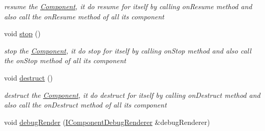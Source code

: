 \begin{DoxyCompactItemize}
\begin{DoxyCompactList}\small\item\em resume the \hyperlink{class_i_dream_sky_1_1_component}{Component}, it do resume for itself by calling on\+Resume method and also call the on\+Resume method of all its component \end{DoxyCompactList}\item 
void \hyperlink{class_i_dream_sky_1_1_component_1_1_owner_a15f03464f950e9dd594e9f044827e38f}{stop} ()\hypertarget{class_i_dream_sky_1_1_component_1_1_owner_a15f03464f950e9dd594e9f044827e38f}{}\label{class_i_dream_sky_1_1_component_1_1_owner_a15f03464f950e9dd594e9f044827e38f}

\begin{DoxyCompactList}\small\item\em stop the \hyperlink{class_i_dream_sky_1_1_component}{Component}, it do stop for itself by calling on\+Stop method and also call the on\+Stop method of all its component \end{DoxyCompactList}\item 
void \hyperlink{class_i_dream_sky_1_1_component_1_1_owner_af9a6ef2721ea21d86aece54ab1bae0c0}{destruct} ()\hypertarget{class_i_dream_sky_1_1_component_1_1_owner_af9a6ef2721ea21d86aece54ab1bae0c0}{}\label{class_i_dream_sky_1_1_component_1_1_owner_af9a6ef2721ea21d86aece54ab1bae0c0}

\begin{DoxyCompactList}\small\item\em destruct the \hyperlink{class_i_dream_sky_1_1_component}{Component}, it do destruct for itself by calling on\+Destruct method and also call the on\+Destruct method of all its component \end{DoxyCompactList}\item 
void \hyperlink{class_i_dream_sky_1_1_component_1_1_owner_a4bcd81179c5e4ce113f88c6925149ef4}{debug\+Render} (\hyperlink{class_i_dream_sky_1_1_i_component_debug_renderer}{I\+Component\+Debug\+Renderer} \&debug\+Renderer)\hypertarget{class_i_dream_sky_1_1_component_1_1_owner_a4bcd81179c5e4ce113f88c6925149ef4}{}\label{class_i_dream_sky_1_1_component_1_1_owner_a4bcd81179c5e4ce113f88c6925149ef4}


\end{DoxyCompactItemize}
